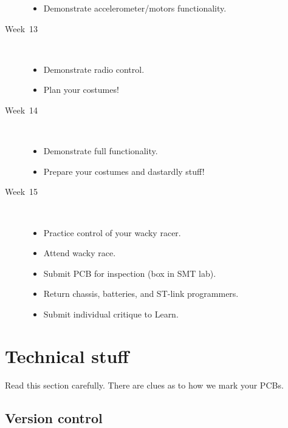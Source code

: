 \documentclass[11pt, a4paper]{article}
\begin{document}
\begin{description}
  \begin{itemize}
  \item Demonstrate accelerometer/motors functionality.
  \end{itemize}

\item [Week~13]\mbox{}\\[-0.4cm]

  \begin{itemize}
  \item Demonstrate radio control.

  \item Plan your costumes!
  \end{itemize}

\item [Week~14]\mbox{}\\[-0.4cm]

  \begin{itemize}
  \item Demonstrate full functionality.

  \item Prepare your costumes and dastardly stuff!
  \end{itemize}

\item [Week~15]\mbox{}\\[-0.4cm]

  \begin{itemize}
  \item Practice control of your wacky racer.
  \item Attend wacky race.
  \item Submit PCB for inspection (box in SMT lab).
  \item Return chassis, batteries, and ST-link programmers.
  \item Submit individual critique to Learn.
  \end{itemize}

\end{description}



\section{Technical stuff}

Read this section carefully.  There are clues as to how we mark your PCBs.

\subsection{Version control}
\end{document}
